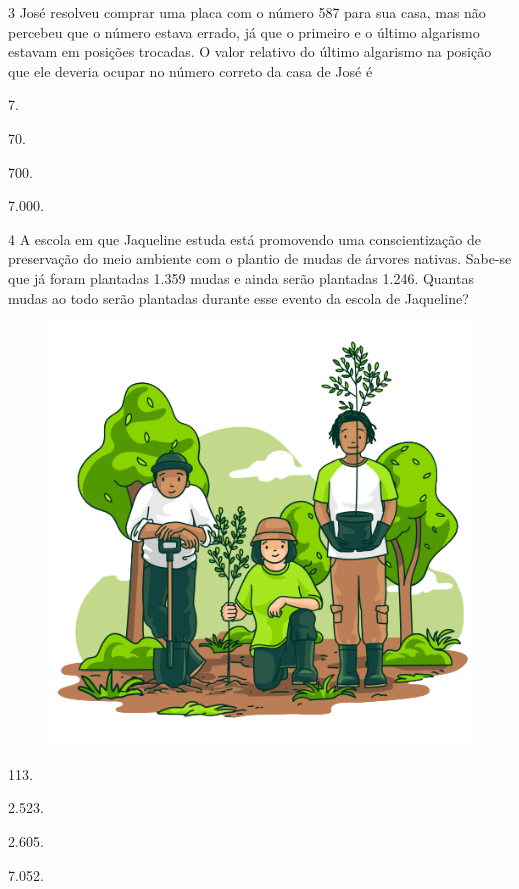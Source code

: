 \pagebreak
\num{3} José resolveu comprar uma placa com o número 587 para sua casa, mas
não percebeu que o número estava
errado, já que o primeiro e o último algarismo estavam em posições
trocadas. O valor relativo do último algarismo na posição que ele 
deveria ocupar no número correto da casa de José é

\begin{multicols}{2}
\begin{escolha}
\item
  7.
\item
  70.
\item
  700.
\item
  7.000.
\end{escolha}
\end{multicols}


\num{4} A escola em que Jaqueline estuda está promovendo uma conscientização de
preservação do meio ambiente com o plantio de mudas de árvores
nativas. Sabe-se que já foram plantadas 1.359 mudas e ainda serão
plantadas 1.246. Quantas mudas ao todo serão plantadas durante esse
evento da escola de Jaqueline?

\begin{figure}[htpb!]
\centering
\includegraphics[width=.6\textwidth]{media/image76a.png}
\end{figure}

\begin{multicols}{2}
\begin{escolha}
\item
  113.
\item
  2.523.
\item
  2.605.
\item
  7.052.
\end{escolha}
\end{multicols}

